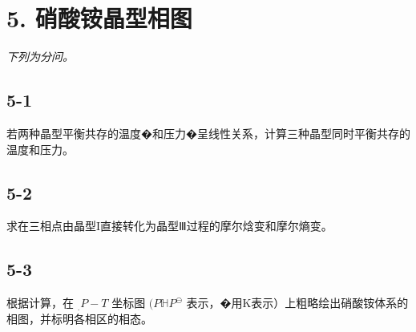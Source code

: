 \section*{5. 硝酸铵晶型相图}
\textit{下列为分问。}

\subsection*{5-1}
若两种晶型平衡共存的温度�和压⼒�呈线性关系，计算三种晶型同时平衡共存的温度和压⼒。

\subsection*{5-2}
求在三相点由晶型I直接转化为晶型Ⅲ过程的摩尔焓变和摩尔熵变。

\subsection*{5-3}
根据计算，在 $_ { . } { P - } T$ 坐标图 $( P \mathbb { H } P ^ { \ominus }$ 表⽰，�⽤K表⽰）上粗略绘出硝酸铵体系的相图，并标明各相区的相态。
